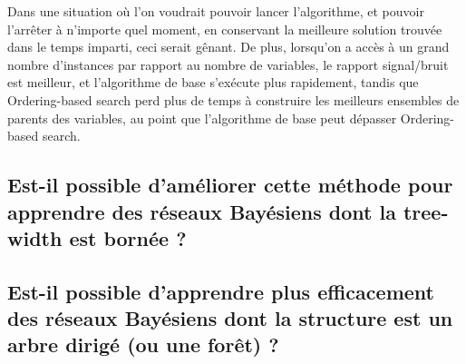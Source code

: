 \documentclass[french,a4paper]{article}
\begin{document}
Dans une situation où l'on voudrait pouvoir lancer l'algorithme, et
pouvoir l'arrêter à n'importe quel moment, en conservant la meilleure
solution trouvée dans le temps imparti, ceci serait gênant. De plus,
lorsqu'on a accès à un grand nombre d'instances par rapport au nombre
de variables, le rapport signal/bruit est meilleur, et l'algorithme de
base s'exécute plus rapidement, tandis que Ordering-based search perd
plus de temps à construire les meilleurs ensembles de parents des
variables, au point que l'algorithme de base peut dépasser
Ordering-based search.

\subsection{Est-il possible d'améliorer cette méthode pour apprendre des réseaux Bayésiens dont la tree-width est bornée ?}
\subsection{Est-il possible d'apprendre plus efficacement des réseaux Bayésiens dont la structure est un arbre dirigé (ou une forêt) ?}
\end{document}
